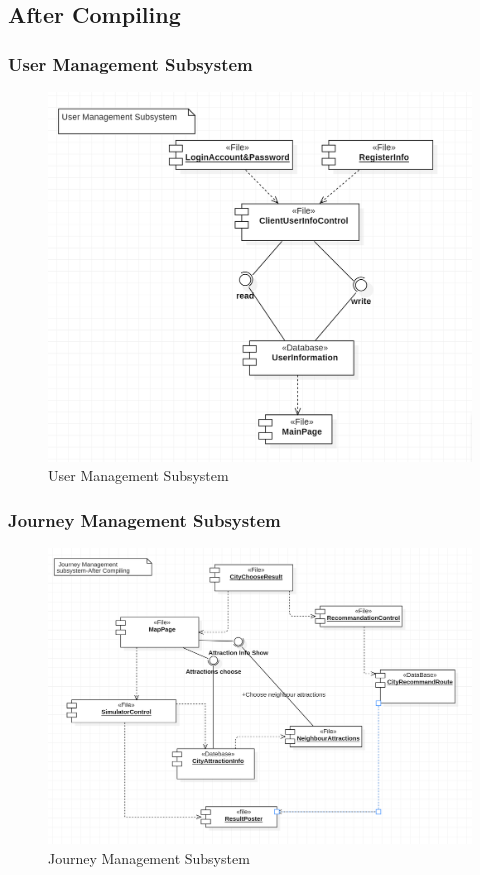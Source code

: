 \documentclass[10pt]{article}
\begin{document}
\subsection{After Compiling}
\subsubsection{User Management Subsystem}

\begin{figure}[H]
    \centering
    
    \includegraphics[width=14cm]{userafter.png}
    \caption{User Management Subsystem}
    \label{User Management Subsystem 2}
\end{figure}

\subsubsection{Journey Management Subsystem}
\begin{figure}[H]
    \centering
    
    \includegraphics[width=14cm]{journeyafter.png}
    \caption{Journey Management Subsystem}
    \label{Journey Management Subsystem 2}
\end{figure}
\end{document}
